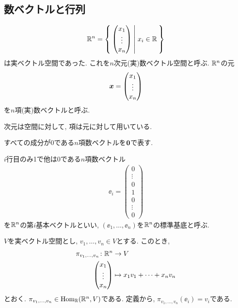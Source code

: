\subsection{数ベクトルと行列}
\begin{align*}
  \mathbb{R}^n=
  \Set{\begin{pmatrix}x_1\\\vdots\\x_n\end{pmatrix}|x_i\in \mathbb{R}}
\end{align*}
は実ベクトル空間であった.
これを$n$次元(実)数ベクトル空間と呼ぶ.
$\mathbb{R}^n$の元
\begin{align*}
  \boldsymbol{x}=\begin{pmatrix}x_1\\\vdots\\x_n\end{pmatrix}
\end{align*}
を$n$項(実)数ベクトルと呼ぶ.
\begin{remark}
  次元は空間に対して, 項は元に対して用いている.
\end{remark}

すべての成分が0である$n$項数ベクトルを$\boldsymbol{0}$で表す.
\begin{definition}
  $i$行目のみ1で他は0である$n$項数ベクトル
  \begin{align*}
    \ee_i=\begin{pmatrix}0\\\vdots\\0\\1\\0\\\vdots\\0\end{pmatrix}
  \end{align*}
  を$\mathbb{R}^n$の第$i$基本ベクトルといい,
  $(\ee_1,\ldots,\ee_n)$を$\mathbb{R}^n$の標準基底と呼ぶ.
\end{definition}

$V$を実ベクトル空間とし,
$v_1,\ldots,v_n\in V$とする.
このとき,
\begin{align*}
  \pi_{v_1,\ldots,v_n} \colon \mathbb{R}^n &\to V\\
  \begin{pmatrix}x_1\\\vdots\\x_n\end{pmatrix}&\mapsto
    x_1v_1+\cdots+x_nv_n
\end{align*}
とおく.
$\pi_{v_1,\ldots,v_n}\in \operatorname{Hom}_{\mathbb{R}}(\mathbb{R}^n,V)$である.
定義から,
$\pi_{v_1,\ldots,v_n}(\ee_i)=v_i$である.

